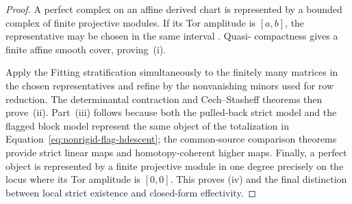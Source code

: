 \documentclass[11pt]{article}
\theoremstyle{definition}
\begin{document}
\begin{proof}
A perfect complex on an affine derived chart is represented by a bounded
complex of finite projective modules.  If its Tor amplitude is $[a,b]$, the
representative may be chosen in the same interval
\cite[Section~15.76, especially Lemma~15.76.2]{StacksPerfect}.  Quasi-
compactness gives a finite affine smooth cover, proving~(i).

Apply the Fitting stratification simultaneously to the finitely many matrices
in the chosen representatives and refine by the nonvanishing minors used for
row reduction.  The determinantal contraction and Cech--Stasheff theorems
then prove~(ii).  Part~(iii) follows because both the pulled-back strict model
and the flagged block model represent the same object of the totalization in
Equation~\eqref{eq:nonrigid-flag-hdescent}; the common-source comparison
theorems provide strict linear maps and homotopy-coherent higher maps.
Finally, a perfect object is represented by a finite projective module in one
degree precisely on the locus where its Tor amplitude is $[0,0]$.  This proves
(iv) and the final distinction between local strict existence and closed-form
effectivity.
\end{proof}
\end{document}
